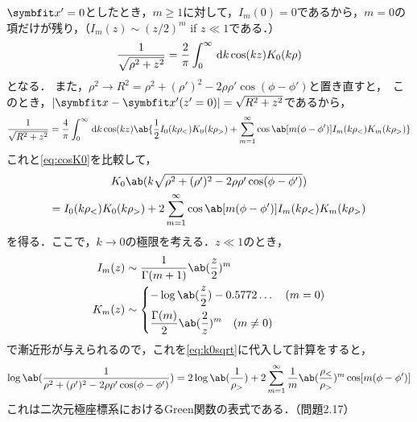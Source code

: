 $\bs{x}' = 0$としたとき，$m \geq 1$に対して，$I_m(0) = 0$であるから，$m = 0$の項だけが残り，（$I_m(z) \sim (z/2)^m $ if $z \ll 1$である．）
\begin{gather}
  \label{eq:cosK0}
  \frac{1}{\sqrt{\rho^2 + z^2}} = \frac{2}{\pi} \int_0^\infty \dl{k} \cos(kz) K_0(k\rho)
\end{gather}
となる．
また，$\rho^2 \to R^2 = \rho^2 + (\rho')^2 - 2 \rho \rho' \cos(\phi - \phi')$と置き直すと， このとき，$|\bs{x} - \bs{x}'(z'=0)| = \sqrt{R^2 + z^2}$であるから，
\begin{gather}
  \frac{1}{\sqrt{R^2 + z^2}} = \frac{4}{\pi} \int_0^\infty \dl{k} \cos(kz) \ab\{ \frac12 I_0(k\rho_<)K_0(k\rho_>) + \sum_{m=1}^{\infty}\cos\ab[m(\phi - \phi')]I_m(k\rho_<) K_m(k\rho_>)\}
\end{gather}
これと\eqref{eq:cosK0}を比較して，
\begin{multline}
  \label{eq:k0sqrt}
  K_0\ab(k\sqrt{\rho^2 + (\rho')^2 - 2 \rho \rho'\cos(\phi - \phi')}) \\
  = I_0(k\rho_<)K_0(k\rho_>) + 2 \sum_{m=1}^{\infty}\cos\ab[m(\phi - \phi')]I_m(k\rho_<) K_m(k\rho_>)
\end{multline}
を得る．ここで，$k\to 0$の極限を考える．$z \ll 1$のとき，
\begin{align}
  I_m(z) &\sim \frac{1}{\Gamma(m+1)} \ab(\frac{z}{2})^m\\
  K_m(z) &\sim
  \begin{dcases}
    -\log\ab(\frac{z}2) - 0.5772\ldots \qq (m=0)\\
    \frac{\Gamma(m)}{2}\ab(\frac{2}{z})^m\qq (m\neq 0)
  \end{dcases}
\end{align}
で漸近形が与えられるので，これを\eqref{eq:k0sqrt}に代入して計算をすると，
\begin{gather}
  \log\ab(\frac{1}{\rho^2 + (\rho')^2 - 2 \rho \rho' \cos(\phi - \phi')}) = 2\log\ab(\frac{1}{\rho_>}) + 2 \sum_{m=1}^{\infty}\frac{1}{m}\ab(\frac{\rho_<}{\rho_>})^m\cos[m(\phi - \phi')]
\end{gather}
これは二次元極座標系におけるGreen関数の表式である．（問題2.17）



